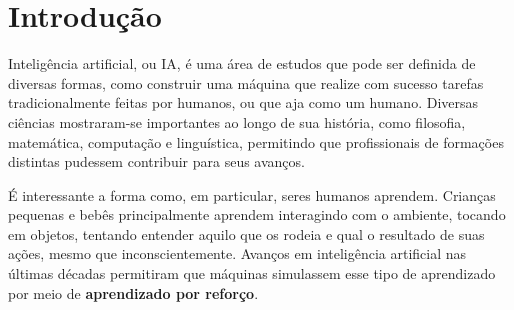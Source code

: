 
\chapter{Introdução}
\label{cap:introducao}

Inteligência artificial, ou IA, é uma área de estudos que pode ser definida de diversas formas, como construir uma máquina que realize com sucesso tarefas tradicionalmente feitas por humanos, ou que aja como um humano.
Diversas ciências mostraram-se importantes ao longo de sua história, como filosofia, matemática, computação e linguística, permitindo que profissionais de formações distintas pudessem contribuir para seus avanços.

É interessante a forma como, em particular, seres humanos aprendem.
Crianças pequenas e bebês principalmente aprendem interagindo com o ambiente, tocando em objetos, tentando entender aquilo que os rodeia e qual o resultado de suas ações, mesmo que inconscientemente.
Avanços em inteligência artificial nas últimas décadas permitiram que máquinas simulassem esse tipo de aprendizado por meio de \textbf{aprendizado por reforço}.

